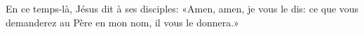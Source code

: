 En ce temps-là, Jésus dit à ses disciples:
	«Amen, amen, je vous le dis:
	ce que vous demanderez au Père en mon nom, il vous le donnera.»
